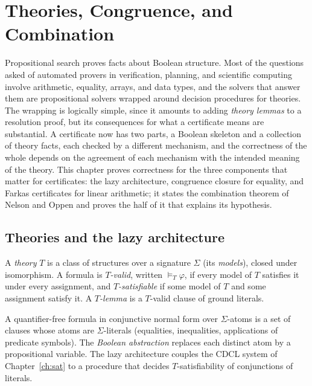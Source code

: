 \chapter{Theories, Congruence, and Combination}
\label{ch:smt}

Propositional search proves facts about Boolean structure. Most of the questions asked of automated provers in verification, planning, and scientific computing involve arithmetic, equality, arrays, and data types, and the solvers that answer them are propositional solvers wrapped around decision procedures for theories. The wrapping is logically simple, since it amounts to adding \emph{theory lemmas} to a resolution proof, but its consequences for what a certificate means are substantial. A certificate now has two parts, a Boolean skeleton and a collection of theory facts, each checked by a different mechanism, and the correctness of the whole depends on the agreement of each mechanism with the intended meaning of the theory. This chapter proves correctness for the three components that matter for certificates: the lazy architecture, congruence closure for equality, and Farkas certificates for linear arithmetic; it states the combination theorem of Nelson and Oppen and proves the half of it that explains its hypothesis.

\section{Theories and the lazy architecture}
\label{sec:lazy}

\begin{definition}
\label{def:theory}
A \emph{theory} $T$ is a class of structures over a signature $\Sigma$ (its \emph{models}), closed under isomorphism. A formula is \emph{$T$-valid}, written $\models_T\varphi$, if every model of $T$ satisfies it under every assignment, and \emph{$T$-satisfiable} if some model of $T$ and some assignment satisfy it. A \emph{$T$-lemma} is a $T$-valid clause of ground literals.
\end{definition}

A quantifier-free formula in conjunctive normal form over $\Sigma$-atoms is a set of clauses whose atoms are $\Sigma$-literals (equalities, inequalities, applications of predicate symbols). The \emph{Boolean abstraction} replaces each distinct atom by a propositional variable. The lazy architecture couples the CDCL system of Chapter~\ref{ch:sat} to a procedure that decides $T$-satisfiability of conjunctions of literals.

